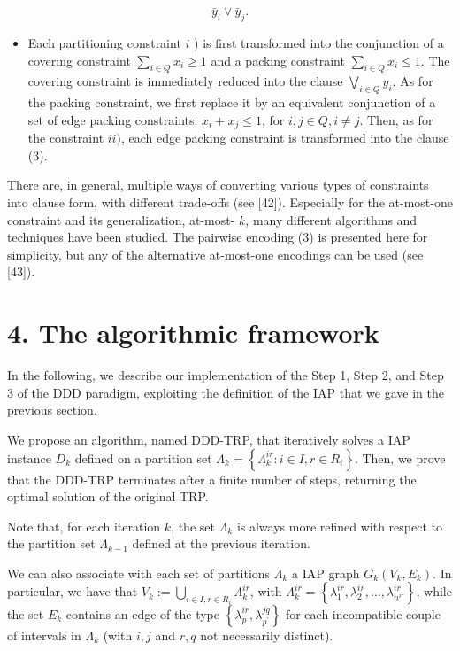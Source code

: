 \documentclass[10pt]{article}
\begin{document}
\begin{equation*}
\bar{y}_{i} \vee \bar{y}_{j} . \tag{3}
\end{equation*}


    \begin{itemize}
      \item Each partitioning constraint $i$ ) is first transformed into the conjunction of a covering constraint $\sum_{i \in Q} x_{i} \geq 1$ and a packing constraint $\sum_{i \in Q} x_{i} \leq 1$. The covering constraint is immediately reduced into the clause $\bigvee_{i \in Q} y_{i}$. As for the packing constraint, we first replace it by an equivalent conjunction of a set of edge packing constraints: $x_{i}+x_{j} \leq 1$, for $i, j \in Q, i \neq j$. Then, as for the constraint $i i)$, each edge packing constraint is transformed into the clause (3).
    \end{itemize}
There are, in general, multiple ways of converting various types of constraints into clause form, with different trade-offs (see [42]). Especially for the at-most-one constraint and its generalization, at-most- $k$, many different algorithms and techniques have been studied. The pairwise encoding (3) is presented here for simplicity, but any of the alternative at-most-one encodings can be used (see [43]).

\section*{4. The algorithmic framework}
In the following, we describe our implementation of the Step 1, Step 2, and Step 3 of the DDD paradigm, exploiting the definition of the IAP that we gave in the previous section.

We propose an algorithm, named DDD-TRP, that iteratively solves a IAP instance $D_{k}$ defined on a partition set $\Lambda_{k}=\left\{\Lambda_{k}^{i r}: i \in I, r \in R_{i}\right\}$. Then, we prove that the DDD-TRP terminates after a finite number of steps, returning the optimal solution of the original TRP.

Note that, for each iteration $k$, the set $\Lambda_{k}$ is always more refined with respect to the partition set $\Lambda_{k-1}$ defined at the previous iteration.

We can also associate with each set of partitions $\Lambda_{k}$ a IAP graph $G_{k}\left(V_{k}, E_{k}\right)$. In particular, we have that $V_{k}:=\bigcup_{i \in I, r \in R_{i}} \Lambda_{k}^{i r}$, with $\Lambda_{k}^{i r}=\left\{\lambda_{1}^{i r}, \lambda_{2}^{i r}, \ldots, \lambda_{n^{i r}}^{i r}\right\}$, while the set $E_{k}$ contains an edge of the type $\left\{\lambda_{p}^{i r}, \lambda_{p^{\prime}}^{j q}\right\}$ for each incompatible couple of intervals in $\Lambda_{k}$ (with $i, j$ and $r, q$ not necessarily distinct).
\end{document}
